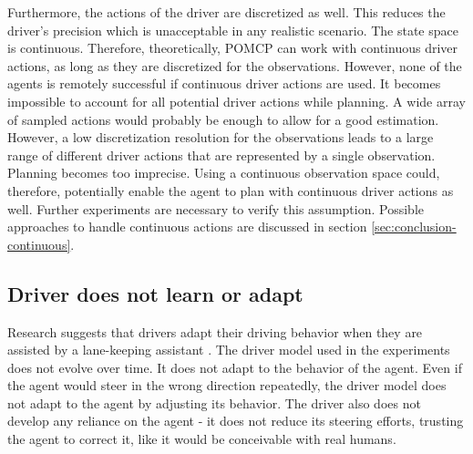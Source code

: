 Furthermore, the actions of the driver are discretized as well. This reduces the driver's precision which is unacceptable in any realistic scenario. The state space is continuous. Therefore, theoretically, POMCP can work with continuous driver actions, as long as they are discretized for the observations. However, none of the agents is remotely successful if continuous driver actions are used. It becomes impossible to account for all potential driver actions while planning. A wide array of sampled actions would probably be enough to allow for a good estimation. However, a low discretization resolution for the observations leads to a large range of different driver actions that are represented by a single observation. Planning becomes too imprecise. Using a continuous observation space could, therefore, potentially enable the agent to plan with continuous driver actions as well. Further experiments are necessary to verify this assumption. Possible approaches to handle continuous actions are discussed in section \ref{sec:conclusion-continuous}.

\subsection{Driver does not learn or adapt}

Research suggests that drivers adapt their driving behavior when they are assisted by a lane-keeping assistant \parencite{behavior_adapt}. The driver model used in the experiments does not evolve over time. It does not adapt to the behavior of the agent. Even if the agent would steer in the wrong direction repeatedly, the driver model does not adapt to the agent by adjusting its behavior. The driver also does not develop any reliance on the agent - it does not reduce its steering efforts, trusting the agent to correct it, like it would be conceivable with real humans.




